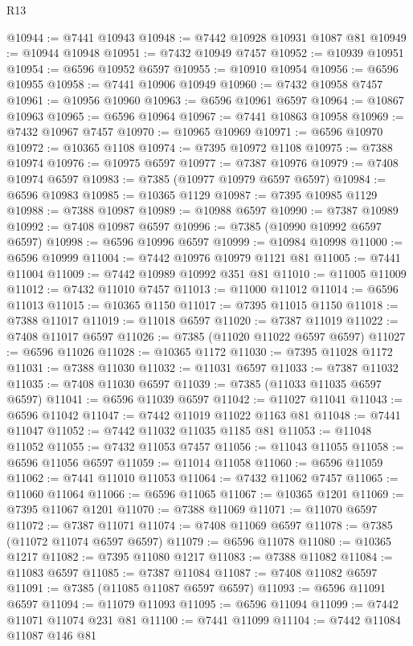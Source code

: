 \begin{lexlean}{R13}
\begin{coremodule}
@10944 := @7441 @10943
@10948 := @7442 @10928 @10931 @1087 @81
@10949 := @10944 @10948
@10951 := @7432 @10949 @7457
@10952 := @10939 @10951
@10954 := @6596 @10952 @6597
@10955 := @10910 @10954
@10956 := @6596 @10955
@10958 := @7441 @10906 @10949
@10960 := @7432 @10958 @7457
@10961 := @10956 @10960
@10963 := @6596 @10961 @6597
@10964 := @10867 @10963
@10965 := @6596 @10964
@10967 := @7441 @10863 @10958
@10969 := @7432 @10967 @7457
@10970 := @10965 @10969
@10971 := @6596 @10970
@10972 := @10365 @1108
@10974 := @7395 @10972 @1108
@10975 := @7388 @10974
@10976 := @10975 @6597
@10977 := @7387 @10976
@10979 := @7408 @10974 @6597
@10983 := @7385 (@10977 @10979 @6597 @6597)
@10984 := @6596 @10983
@10985 := @10365 @1129
@10987 := @7395 @10985 @1129
@10988 := @7388 @10987
@10989 := @10988 @6597
@10990 := @7387 @10989
@10992 := @7408 @10987 @6597
@10996 := @7385 (@10990 @10992 @6597 @6597)
@10998 := @6596 @10996 @6597
@10999 := @10984 @10998
@11000 := @6596 @10999
@11004 := @7442 @10976 @10979 @1121 @81
@11005 := @7441 @11004
@11009 := @7442 @10989 @10992 @351 @81
@11010 := @11005 @11009
@11012 := @7432 @11010 @7457
@11013 := @11000 @11012
@11014 := @6596 @11013
@11015 := @10365 @1150
@11017 := @7395 @11015 @1150
@11018 := @7388 @11017
@11019 := @11018 @6597
@11020 := @7387 @11019
@11022 := @7408 @11017 @6597
@11026 := @7385 (@11020 @11022 @6597 @6597)
@11027 := @6596 @11026
@11028 := @10365 @1172
@11030 := @7395 @11028 @1172
@11031 := @7388 @11030
@11032 := @11031 @6597
@11033 := @7387 @11032
@11035 := @7408 @11030 @6597
@11039 := @7385 (@11033 @11035 @6597 @6597)
@11041 := @6596 @11039 @6597
@11042 := @11027 @11041
@11043 := @6596 @11042
@11047 := @7442 @11019 @11022 @1163 @81
@11048 := @7441 @11047
@11052 := @7442 @11032 @11035 @1185 @81
@11053 := @11048 @11052
@11055 := @7432 @11053 @7457
@11056 := @11043 @11055
@11058 := @6596 @11056 @6597
@11059 := @11014 @11058
@11060 := @6596 @11059
@11062 := @7441 @11010 @11053
@11064 := @7432 @11062 @7457
@11065 := @11060 @11064
@11066 := @6596 @11065
@11067 := @10365 @1201
@11069 := @7395 @11067 @1201
@11070 := @7388 @11069
@11071 := @11070 @6597
@11072 := @7387 @11071
@11074 := @7408 @11069 @6597
@11078 := @7385 (@11072 @11074 @6597 @6597)
@11079 := @6596 @11078
@11080 := @10365 @1217
@11082 := @7395 @11080 @1217
@11083 := @7388 @11082
@11084 := @11083 @6597
@11085 := @7387 @11084
@11087 := @7408 @11082 @6597
@11091 := @7385 (@11085 @11087 @6597 @6597)
@11093 := @6596 @11091 @6597
@11094 := @11079 @11093
@11095 := @6596 @11094
@11099 := @7442 @11071 @11074 @231 @81
@11100 := @7441 @11099
@11104 := @7442 @11084 @11087 @146 @81

\end{coremodule}
\end{lexlean}
